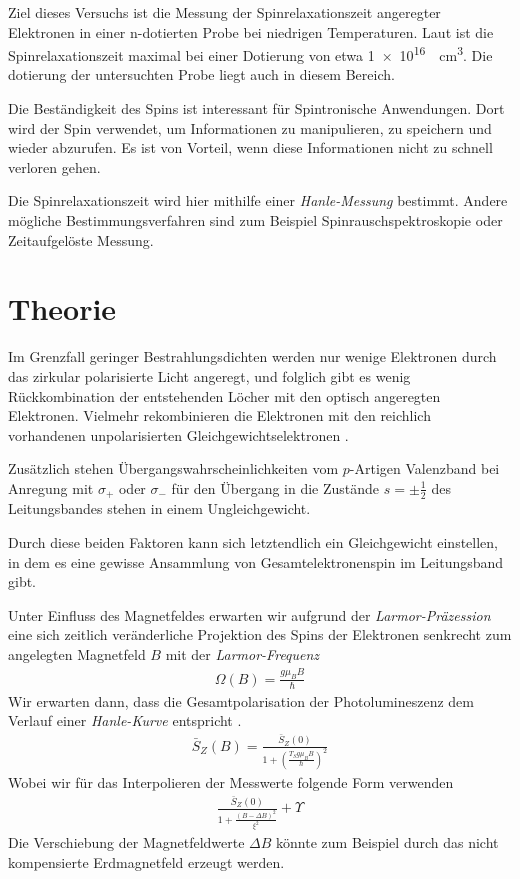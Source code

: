 \documentclass[11pt,twoside=true]{scrartcl}
\begin{document}
Ziel dieses Versuchs ist die Messung der Spinrelaxationszeit angeregter
Elektronen in einer n-dotierten  Probe bei niedrigen Temperaturen. 
Laut \cite{dzhioev2002low} ist die Spinrelaxationszeit maximal bei einer
Dotierung von etwa \SI{1e16}{\per\cubic\centi\metre}. Die dotierung der
untersuchten Probe liegt auch in diesem Bereich.

Die Beständigkeit des Spins ist interessant für Spintronische Anwendungen. Dort
wird der Spin verwendet, um Informationen zu manipulieren, zu speichern und
wieder abzurufen. Es ist von Vorteil, wenn diese Informationen nicht zu schnell
verloren gehen.

Die Spinrelaxationszeit wird hier mithilfe einer \emph{Hanle-Messung} bestimmt.
Andere mögliche Bestimmungsverfahren sind zum Beispiel Spinrauschspektroskopie oder
Zeitaufgelöste Messung.


\section{Theorie}

Im Grenzfall geringer Bestrahlungsdichten werden nur wenige Elektronen durch
das zirkular polarisierte Licht angeregt, und folglich gibt es wenig 
Rückkombination der entstehenden Löcher mit den optisch angeregten Elektronen.
Vielmehr rekombinieren die Elektronen mit den reichlich vorhandenen 
unpolarisierten Gleichgewichtselektronen . 

Zusätzlich stehen Übergangswahrscheinlichkeiten vom $p$-Artigen Valenzband bei
Anregung mit $\sigma_+$ oder $\sigma_-$ für den Übergang in die Zustände $s =
\pm\frac{1}{2}$ des Leitungsbandes stehen in einem Ungleichgewicht. 

Durch diese beiden Faktoren kann sich letztendlich ein Gleichgewicht einstellen,
in dem es eine gewisse Ansammlung von Gesamtelektronenspin im Leitungsband gibt.

Unter Einfluss des Magnetfeldes erwarten wir aufgrund der \emph{Larmor-Präzession}
eine sich zeitlich veränderliche Projektion des Spins der Elektronen senkrecht
zum angelegten Magnetfeld $B$ mit der \emph{Larmor-Frequenz}
\begin{align*}
  \Omega(B) = \frac{g \mu_B B }{\hbar}
\end{align*}
%
Wir erwarten dann, dass die Gesamtpolarisation
der Photolumineszenz dem Verlauf einer \emph{Hanle-Kurve} entspricht
\cite{fpspindynamik}.
%
\begin{align*}
  \bar{S}_Z(B) = \frac{\bar{S}_Z(0)}{1 + \left( \frac{T_S g \mu_B B}{\hbar} \right)^2}  
\end{align*}
%
Wobei wir für das Interpolieren der Messwerte folgende Form verwenden
%
\begin{align*}
  \frac{\bar{S}_Z(0)}{1 + \frac{(B - \Delta B)^2}{\xi^2}} + \Upsilon 
\end{align*}
%
Die Verschiebung der Magnetfeldwerte $\Delta B$ könnte zum Beispiel 
durch das nicht kompensierte Erdmagnetfeld erzeugt werden.
\end{document}
